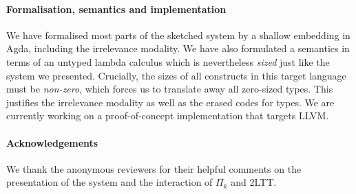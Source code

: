 

\paragraph{Formalisation, semantics and implementation}

We have formalised most parts of the sketched system by a shallow embedding in
Agda, including the irrelevance modality. We have also formulated a semantics in
terms of an untyped lambda calculus which is nevertheless \emph{sized} just like
the system we presented. Crucially, the sizes of all constructs in this target language
must be \emph{non-zero}, which forces us to translate away all zero-sized types. This
justifies the irrelevance modality as well as the erased codes for types. We are
currently working on a proof-of-concept implementation that targets LLVM.

\paragraph{Acknowledgements}

We thank the anonymous reviewers for their helpful comments on the presentation
of the system and the interaction of $\Pi_k$ and 2LTT.

